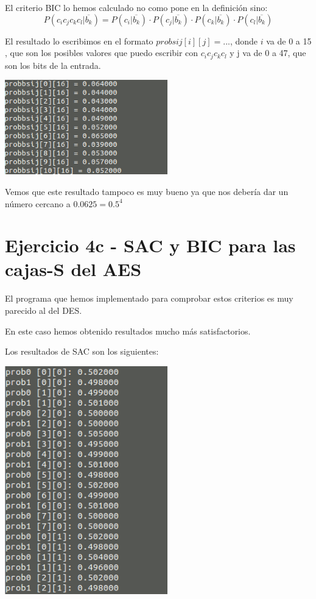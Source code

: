 \documentclass{apuntes}
\begin{document}
El criterio BIC lo hemos calculado no como pone en la definición sino:
$$P(c_ic_jc_kc_l|\overline{b_k}) = P(c_i|\overline{b_k})\cdot P(c_j|\overline{b_k})\cdot P(c_k|\overline{b_k})\cdot P(c_l|\overline{b_k})$$

El resultado lo escribimos en el formato $probsij[i][j] = ...$, donde $i$ va de 0 a 15 , que son los posibles valores que puedo escribir con $c_ic_jc_kc_l$ y j va de 0 a 47, que son los bits de la entrada.

\begin{center}
	\includegraphics[width=200pt]{BICDES.png}
\end{center}

Vemos que este resultado tampoco es muy bueno ya que nos debería dar un número cercano a $0.0625 = 0.5^4$


\section{Ejercicio 4c - SAC y BIC para las cajas-S del AES}

El programa que hemos implementado para comprobar estos criterios es muy parecido al del DES.

En este caso hemos obtenido resultados mucho más satisfactorios.

Los resultados de SAC son los siguientes:
\begin{center}
	\includegraphics[width=200pt]{SACAES.png}
\end{center}
\end{document}
